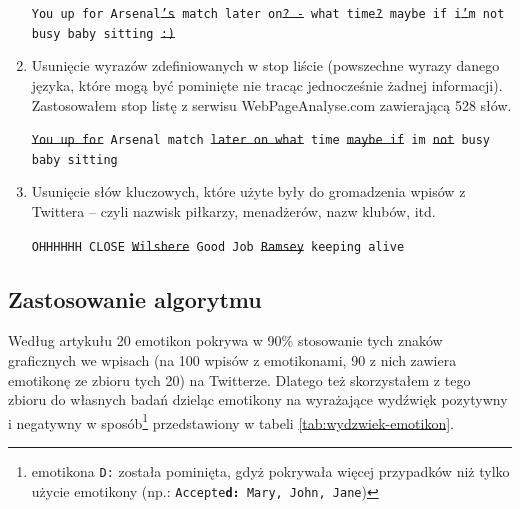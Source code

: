 \begin{enumerate}
  \texttt{You up for Arsenal\sout{'s} match later on\sout{? -} what
  time\sout{?} maybe if i\sout{'}m not busy baby sitting \sout{:)}} 
	
	\item Usunięcie wyrazów zdefiniowanych w stop liście (powszechne wyrazy danego
	języka, które mogą być pominięte nie tracąc jednocześnie żadnej informacji).
	Zastosowałem stop listę z serwisu \mbox{WebPageAnalyse.com} 
	\cite{WebPageAnalyse} zawierającą 528 słów.

	\texttt{\sout{You up for} Arsenal match \sout{later on what} time \sout{maybe if} 
 	im \sout{not} busy baby sitting}
	
	\item Usunięcie słów kluczowych, które użyte były do gromadzenia wpisów z
	Twittera -- czyli nazwisk piłkarzy, menadżerów, nazw klubów, itd.
	
	
	\texttt{OHHHHHH CLOSE \sout{Wilshere} Good Job \sout{Ramsey} keeping alive}
	
\end{enumerate}





\subsection{Zastosowanie algorytmu}
\label{subsection:sentyment-algorytm}
 

Według artykułu \cite{EmoticonAnalysisTwitter} 20 emotikon pokrywa w 90\%
stosowanie tych znaków graficznych we wpisach (na 100 wpisów z emotikonami, 90 z
nich zawiera emotikonę ze zbioru tych 20) na Twitterze. Dlatego też skorzystałem
z tego zbioru do własnych badań dzieląc emotikony na wyrażające wydźwięk pozytywny i
negatywny w sposób\footnote{emotikona \texttt{D:} została pominięta, gdyż
pokrywała więcej przypadków niż tylko użycie emotikony (np.:
\texttt{Accepte\textbf{d:} Mary, John, Jane})} przedstawiony w tabeli
\ref{tab:wydzwiek-emotikon}.

